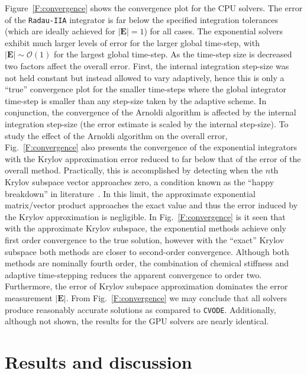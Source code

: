 \documentclass[final,twocolumn]{elsarticle}
\begin{document}
Figure~\ref{F:convergence} shows the convergence plot for the CPU solvers.
The error of the \texttt{Radau-IIA} integrator is far below the specified integration tolerances (which are ideally achieved for $\left\lvert\textbf{E}\right\rvert = 1$) for all cases.
The exponential solvers exhibit much larger levels of error for the larger global time-step, with $\left\lvert\textbf{E}\right\rvert \sim \mathcal{O}(1)$ for the largest global time-step.
As the time-step size is decreased two factors affect the overall error.
First, the internal integration step-size was not held constant but instead allowed to vary adaptively, hence this is only a ``true'' convergence plot for the smaller time-steps where the global integrator time-step is smaller than any step-size taken by the adaptive scheme.
In conjunction, the convergence of the Arnoldi algorithm is affected by the internal integration step-size (the error estimate is scaled by the internal step-size).
To study the effect of the Arnoldi algorithm on the overall error, Fig.~\ref{F:convergence} also presents the convergence of the exponential integrators with the Krylov approximation error reduced to far below that of the error of the overall method.
Practically, this is accomplished by detecting when the $n$th Krylov subspace vector approaches zero, a condition known as the ``happy breakdown'' in literature~\cite{datta2010numerical}.
In this limit, the approximate exponential matrix\slash vector product approaches the exact value and thus the error induced by the Krylov approximation is negligible.
In Fig.~\ref{F:convergence} is it seen that with the approximate Krylov subspace, the exponential methods achieve only first order convergence to the true solution, however with the ``exact'' Krylov subspace both methods are closer to second-order convergence.
Although both methods are nominally fourth order, the combination of chemical stiffness and adaptive time-stepping reduces the apparent convergence to order two.
Furthermore, the error of Krylov subspace approximation dominates the error measurement $\lvert\textbf{E}\rvert$.
From Fig.~\ref{F:convergence} we may conclude that all solvers produce reasonably accurate solutions as compared to \texttt{CVODE}.
Additionally, although not shown, the results for the GPU solvers are nearly identical.


\section{Results and discussion}
\label{S:results}
\ifmeasure
\addvspace{10pt}
\fi
\end{document}
